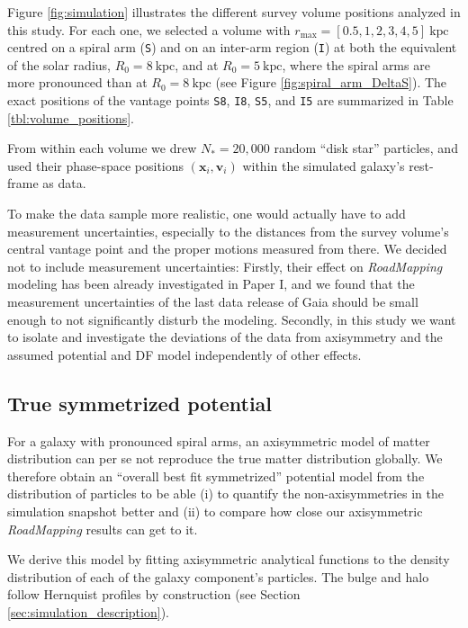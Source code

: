 \documentclass[iop,revtex4,numberedappendix,appendixfloats]{emulateapj}
\newcommand{\vect}[1]{\boldsymbol{#1}}
\newcommand{\RM}{{\sl RoadMapping}}
\begin{document}
Figure \ref{fig:simulation} illustrates the different survey volume positions analyzed in this study. For each one, we selected a volume with $r_\text{max}=[0.5,1,2,3,4,5]~\text{kpc}$ centred on a spiral arm (\texttt{S}) and on an inter-arm region (\texttt{I}) at both the equivalent of the solar radius, $R_0=8~\text{kpc}$, and at $R_0=5~\text{kpc}$, where the spiral arms are more pronounced than at $R_0=8~\text{kpc}$ (see Figure \ref{fig:spiral_arm_DeltaS}). The exact positions of the vantage points \texttt{S8}, \texttt{I8}, \texttt{S5}, and \texttt{I5} are summarized in Table \ref{tbl:volume_positions}.

From within each volume we drew $N_*=20,000$ random ``disk star'' particles, and used their phase-space positions $(\vect{x}_i,\vect{v}_i)$ within the simulated galaxy's rest-frame as data. 

To make the data sample more realistic, one would actually have to add measurement uncertainties, especially to the distances from the survey volume's central vantage point and the proper motions measured from there. We decided not to include measurement uncertainties: Firstly, their effect on \RM{} modeling has been already investigated in Paper I, and we found that the measurement uncertainties of the last data release of Gaia should be small enough to not significantly disturb the modeling. Secondly, in this study we want to isolate and investigate the deviations of the data from axisymmetry and the assumed potential and DF model independently of other effects.

\subsection{True symmetrized potential} \label{sec:DEHH-Pot}

For a galaxy with pronounced spiral arms, an axisymmetric model of matter distribution can per se not reproduce the true matter distribution globally. We therefore obtain an ``overall best fit symmetrized'' potential model from the distribution of particles to be able (i) to quantify the non-axisymmetries in the simulation snapshot better and (ii) to compare how close our axisymmetric \RM{} results can get to it. 

We derive this model by fitting axisymmetric analytical functions to the density distribution of each of the galaxy component's particles. The bulge and halo follow Hernquist profiles by construction (see Section \ref{sec:simulation_description}).
\end{document}
